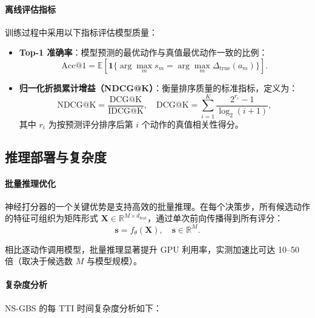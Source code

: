 \documentclass[type=master]{fduthesis}
\begin{document}
\paragraph{离线评估指标}
训练过程中采用以下指标评估模型质量：

\begin{itemize}
\item \textbf{Top-1 准确率}：模型预测的最优动作与真值最优动作一致的比例：
\begin{equation}
\text{Acc@1} = \mathbb{E}\left[\mathbf{1}\big\{\arg\max_m s_m = \arg\max_m \Delta_{\text{true}}(a_m)\big\}\right].
\label{eq:ch4_acc1}
\end{equation}

\item \textbf{归一化折损累计增益（NDCG@K）}：衡量排序质量的标准指标，定义为：
\begin{equation}
\text{NDCG@K} = \frac{\text{DCG@K}}{\text{IDCG@K}}, \quad \text{DCG@K} = \sum_{i=1}^{K} \frac{2^{r_i} - 1}{\log_2(i+1)},
\label{eq:ch4_ndcg}
\end{equation}
其中 $r_i$ 为按预测评分排序后第 $i$ 个动作的真值相关性得分。
\end{itemize}

\subsection{推理部署与复杂度}
\label{subsec:ch4_deployment}

\paragraph{批量推理优化}
神经打分器的一个关键优势是支持高效的批量推理。在每个决策步，所有候选动作的特征可组织为矩阵形式 $\mathbf{X} \in \mathbb{R}^{M \times d_{\text{feat}}}$，通过单次前向传播得到所有评分：
\begin{equation}
\mathbf{s} = f_\theta(\mathbf{X}), \quad \mathbf{s} \in \mathbb{R}^M.
\label{eq:ch4_batch_inference}
\end{equation}

相比逐动作调用模型，批量推理显著提升 GPU 利用率，实测加速比可达 10--50 倍（取决于候选数 $M$ 与模型规模）。

\paragraph{复杂度分析}
NS-GBS 的每 TTI 时间复杂度分析如下：
\end{document}
